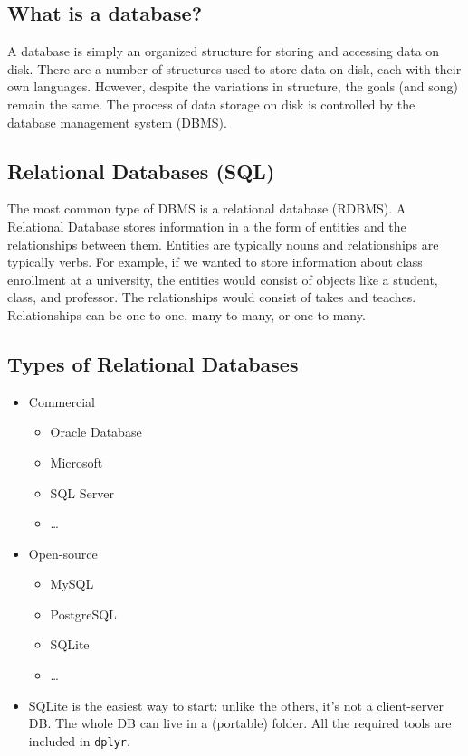 \documentclass[]{book}
\providecommand{\tightlist}{%
  \setlength{\itemsep}{0pt}\setlength{\parskip}{0pt}}
\theoremstyle{definition}
\theoremstyle{definition}
\theoremstyle{definition}
\theoremstyle{remark}
\begin{document}
\subsection{What is a database?}\label{what-is-a-database}

A database is simply an organized structure for storing and accessing
data on disk. There are a number of structures used to store data on
disk, each with their own languages. However, despite the variations in
structure, the goals (and song) remain the same. The process of data
storage on disk is controlled by the database management system (DBMS).

\subsection{Relational Databases (SQL)}\label{relational-databases-sql}

The most common type of DBMS is a relational database (RDBMS). A
Relational Database stores information in a the form of entities and the
relationships between them. Entities are typically nouns and
relationships are typically verbs. For example, if we wanted to store
information about class enrollment at a university, the entities would
consist of objects like a student, class, and professor. The
relationships would consist of takes and teaches. Relationships can be
one to one, many to many, or one to many.

\subsection{Types of Relational
Databases}\label{types-of-relational-databases}

\begin{itemize}
\tightlist
\item
  Commercial

  \begin{itemize}
  \tightlist
  \item
    Oracle Database
  \item
    Microsoft
  \item
    SQL Server
  \item
    \ldots{}
  \end{itemize}
\item
  Open-source

  \begin{itemize}
  \tightlist
  \item
    MySQL
  \item
    PostgreSQL
  \item
    SQLite
  \item
    \ldots{}
  \end{itemize}
\item
  SQLite is the easiest way to start: unlike the others, it's not a
  client-server DB. The whole DB can live in a (portable) folder. All
  the required tools are included in \texttt{dplyr}.
\end{itemize}
\end{document}
